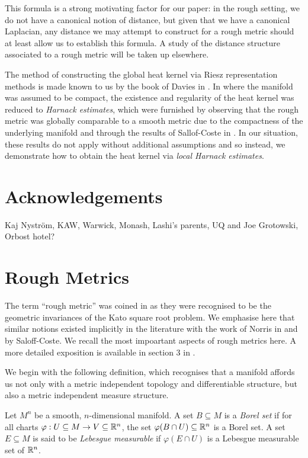 \documentclass[a4paper, 12pt]{amsart}
\begin{document}
This formula is a strong motivating factor for our paper: 
in the rough setting, we do not have a canonical notion of
distance, but given that we have a canonical Laplacian, 
any distance we may attempt to construct for a rough 
metric should at least allow us to establish this formula.  A study of the distance structure associated to a rough metric will be taken up elsewhere.


The method of constructing the global heat kernel
via Riesz representation methods is made known to us by
the book of Davies in \cite{Davies}.
In \cite{BCont} where the manifold was assumed to be compact, 
the existence and regularity of the heat kernel was
reduced to \emph{Harnack estimates}, which were
furnished by observing that  
the rough metric was globally comparable to a smooth metric
due to the compactness of the underlying manifold and
through the  results of Sallof-Coste in \cite{SC}.
In our situation, these results do not apply without additional assumptions
and so instead, we demonstrate
how to obtain the heat kernel via \emph{local Harnack estimates}. 

\section*{Acknowledgements}

Kaj Nyström, KAW, Warwick, Monash, Lashi's parents, UQ and Joe Grotowski, Orbost hotel?

\section{Rough Metrics}
\label{sec:rough_metrics}

The term ``rough metric'' was coined in \cite{BRough} as they were 
recognised to be the geometric invariances of the Kato square root problem.
We emphasise here that similar notions existed implicitly in the 
literature with the work of Norris in \cite{Norris} 
and \cite{SC} by Saloff-Coste.
We recall the most impoartant aspects of rough metrics here. A more detailed exposition is available in section 3 in \cite{BRough}.

We begin with the following definition, which recognises
that a manifold affords us not only with a metric independent 
topology and differentiable structure, but also a metric independent measure
structure.

\begin{defn}
\label{defn:borel_lebesgue}
Let \(M^n\) be a smooth, \(n\)-dimensional manifold. A set \(B \subseteq M\) is a \emph{Borel set} if for all charts \(\varphi : U \subseteq M \to V \subseteq \mathbb{R}^n\), the set \(\varphi(B \cap U) \subseteq \mathbb{R}^n\) is a Borel set. A set \(E \subseteq M\) is said to be \emph{Lebesgue measurable} if \(\varphi(E \cap U)\) is a Lebesgue measurable set of \(\mathbb{R}^n\).
\end{defn}
\end{document}

